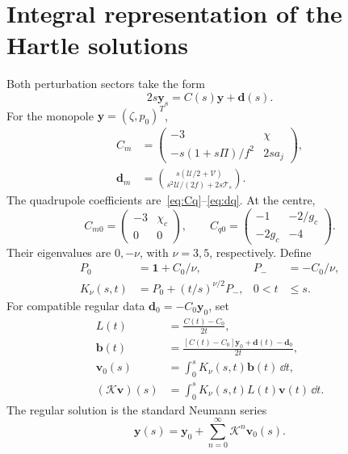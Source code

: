 \section{Integral representation of the Hartle solutions}
\label{app:volterra}
Both perturbation sectors take the form
\begin{equation}
 2s\boldsymbol y_s=C(s)\boldsymbol y+\boldsymbol d(s).
\end{equation}
For the monopole $\boldsymbol y=(\zeta,p_0)^T$,
\begin{align}
 C_m&=\begin{pmatrix}-3&\chi\\-s(1+s\Pi)/f^2&2sa_j\end{pmatrix},\nonumber\\
 \boldsymbol d_m&=\binom{s(\mathcal U/2+\mathcal V)}
 {s^2\mathcal U/(2f)+2s\mathcal T_s}.
\end{align}
The quadrupole coefficients are~\eqref{eq:Cq}--\eqref{eq:dq}. At the centre,
\begin{equation}
 C_{m0}=\begin{pmatrix}-3&\chi_c\\0&0\end{pmatrix},\qquad
 C_{q0}=\begin{pmatrix}-1&-2/g_c\\-2g_c&-4\end{pmatrix}.
\end{equation}
Their eigenvalues are $0,-\nu$, with $\nu=3,5$, respectively. Define
\begin{align}
 P_0&=\mathbf1+C_0/\nu,&P_-&=-C_0/\nu,\nonumber\\
 K_\nu(s,t)&=P_0+(t/s)^{\nu/2}P_-,&0<t&\le s.
\end{align}
For compatible regular data $\boldsymbol d_0=-C_0\boldsymbol y_0$, set
\begin{align}
 L(t)&=\frac{C(t)-C_0}{2t},\nonumber\\
 \boldsymbol b(t)&=\frac{[C(t)-C_0]\boldsymbol y_0+
                     \boldsymbol d(t)-\boldsymbol d_0}{2t},\nonumber\\
 \boldsymbol v_0(s)&=\int_0^sK_\nu(s,t)\boldsymbol b(t)\,\dd t,\nonumber\\
 (\mathcal K\boldsymbol v)(s)&=\int_0^sK_\nu(s,t)L(t)\boldsymbol v(t)\,\dd t.
\end{align}
The regular solution is the standard Neumann series
\begin{equation}
 \boldsymbol y(s)=\boldsymbol y_0+
                    \sum_{n=0}^{\infty}\mathcal K^n\boldsymbol v_0(s).
 \label{eq:volterra}
\end{equation}
